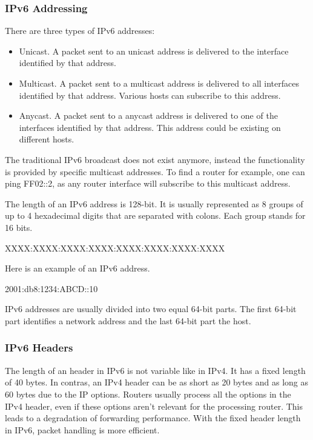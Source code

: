 \documentclass[a4paper]{report}
\begin{document}
\subsubsection{IPv6 Addressing}
\label{sssec:ipv6:addressing}
There are three types of IPv6 addresses:
\begin{itemize}
	\item Unicast. A packet sent to an unicast address is delivered to the interface identified by that address.
	\item Multicast. A packet sent to a multicast address is delivered to all interfaces identified by that address. Various hosts can subscribe to this address.
	\item Anycast. A packet sent to a anycast address is delivered to one of the interfaces identified by that address. This address could be existing on different hosts.
\end{itemize}
The traditional IPv6 broadcast does not exist anymore, instead the functionality is provided by specific multicast addresses. To find a router for example, one can ping FF02::2, as any router interface will subscribe to this multicast address. \parencite[142-143]{Loshin2004}

The length of an IPv6 address is 128-bit. It is usually represented as 8 groups of up to 4 hexadecimal digits that are separated with colons. Each group stands for 16 bits.
\begin{codebox}
	XXXX:XXXX:XXXX:XXXX:XXXX:XXXX:XXXX:XXXX
\end{codebox}
Here is an example of an IPv6 address.
\begin{codebox}
	2001:db8:1234:ABCD::10
\end{codebox}
IPv6 addresses are usually divided into two equal 64-bit parts. The first 64-bit part identifies a network address and the last 64-bit part the host. \parencite[144-146]{Loshin2004}
 
\subsubsection{IPv6 Headers}
\label{sssec:ipv6:headers}
The length of an header in IPv6 is not variable like in IPv4. It has a fixed length of 40 bytes. In contras, an IPv4 header can be as short as 20 bytes and as long as 60 bytes due to the IP options. Routers usually process all the options in the IPv4 header, even if these options aren't relevant for the processing router. This leads to a degradation of forwarding performance.  With the fixed header length in IPv6, packet handling is more efficient. \parencite[128]{Loshin2004}
\end{document}
